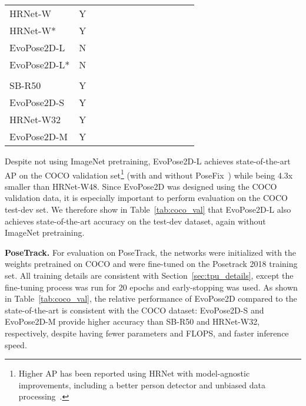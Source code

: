 \documentclass{ieeeaccess}
\begin{document}
\begin{table*}
\begin{tabular}{l|c|c|c|c|c|c|c|ccccc}
HRNet-W~\cite{sun2019deep} & Y & &   & &  &   & 
&&&&&\\
HRNet-W*~\cite{moon2019posefix} & Y &  &   & &  &   & 
&&&&&\\
\hline
EvoPose2D-L & N & & & &  &  
& & &&&&\\
EvoPose2D-L* &  N &  & & &  &  
& & &&&&\\
\hline\noalign{\smallskip}
\multicolumn{8}{l}{\textbf{PoseTrack 2018 Validation Dataset}}\\
\hline
SB-R50 & Y &   & & &  & 
& & &&&&\\
EvoPose2D-S & Y &  & &  &  &  
& & &&&&\\
\hline
HRNet-W32 & Y &  & & &  &  
& & &&&&\\
EvoPose2D-M & Y &  & & &  &  
& & &&&&\\
\hline
\end{tabular}
\caption{Comparisons on various datasets. The \texttt{pycocotools} package was used for evaluation. For the COCO datasets, the models in the bottom sections were implemented as per Section~\ref{sec:tpu_details}. For the PoseTrack dataset, all models were implemented as per Section~\ref{sec:sota}. PT: ImageNet pretraining for evaluation on COCO, and COCO pretraining for evaluation on PoseTrack. *: including PoseFix post-processing~\cite{moon2019posefix}. : EvoPose2D network head stacked on top of EfficientNet-B0. : recalculated for consistency. Network file size provided for float32 models. Frames per second (FPS) averaged over 1k forward passes on NVIDIA TITAN Xp GPU using a batch size of 1. Best results shown in \textbf{bold}.}
\label{tab:coco_val}
\end{table*}



Despite not using ImageNet pretraining, EvoPose2D-L achieves state-of-the-art AP on the COCO validation set\footnote{Higher AP has been reported using HRNet with model-agnostic improvements, including a better person detector and unbiased data processing~\cite{huang2020devil}.} (with and without PoseFix~\cite{moon2019posefix}) while being 4.3x smaller than HRNet-W48. Since EvoPose2D was designed using the COCO validation data, it is especially important to perform evaluation on the COCO test-dev set. We therefore show in Table~\ref{tab:coco_val} that EvoPose2D-L also achieves state-of-the-art accuracy on the test-dev dataset, again without ImageNet pretraining.

\medskip\noindent\textbf{PoseTrack.} For evaluation on PoseTrack, the networks were initialized with the weights pretrained on COCO and were fine-tuned on the Posetrack 2018 training set. All training details are consistent with Section~\ref{sec:tpu_details}, except the fine-tuning process was run for 20 epochs and early-stopping was used. As shown in Table~\ref{tab:coco_val}, the relative performance of EvoPose2D compared to the state-of-the-art is consistent with the COCO dataset: EvoPose2D-S and EvoPose2D-M provide higher accuracy than SB-R50 and HRNet-W32, respectively, despite having fewer parameters and FLOPS, and faster inference speed.
\end{document}
